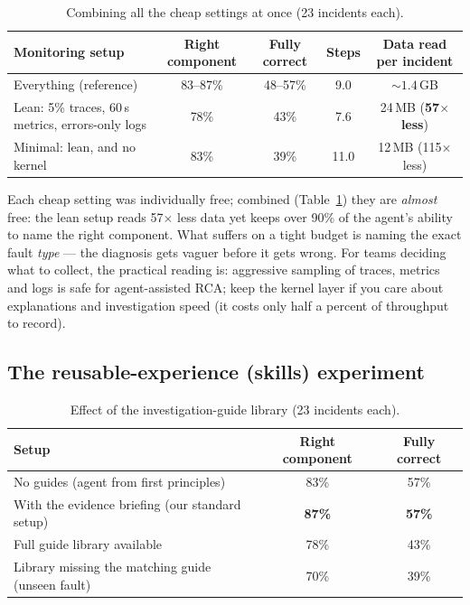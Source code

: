 \begin{table}[h]
\centering
\caption{Combining all the cheap settings at once (23 incidents each).}
\label{tab:budget}
\begin{tabular}{lcccc}
\toprule
Monitoring setup & Right component & Fully correct & Steps & Data read per incident \\
\midrule
Everything (reference) & 83--87\% & 48--57\% & 9.0 & ${\sim}1.4$\,GB \\
Lean: 5\% traces, 60\,s metrics, errors-only logs & 78\% & 43\% & 7.6 & 24\,MB (\textbf{57$\times$ less}) \\
Minimal: lean, and no kernel & 83\% & 39\% & 11.0 & 12\,MB (115$\times$ less) \\
\bottomrule
\end{tabular}
\end{table}

Each cheap setting was individually free; combined (Table~\ref{tab:budget}) they are
\emph{almost} free: the lean setup reads 57$\times$ less data yet keeps over 90\% of
the agent's ability to name the right component. What suffers on a tight budget is
naming the exact fault \emph{type} --- the diagnosis gets vaguer before it gets
wrong. For teams deciding what to collect, the practical reading is: aggressive
sampling of traces, metrics and logs is safe for agent-assisted RCA; keep the kernel
layer if you care about explanations and investigation speed (it costs only half a
percent of throughput to record).

\subsection{The reusable-experience (skills) experiment}

\begin{table}[h]
\centering
\caption{Effect of the investigation-guide library (23 incidents each).}
\label{tab:skills}
\begin{tabular}{lcc}
\toprule
Setup & Right component & Fully correct \\
\midrule
No guides (agent from first principles) & 83\% & 57\% \\
With the evidence briefing (our standard setup) & \textbf{87\%} & \textbf{57\%} \\
Full guide library available & 78\% & 43\% \\
Library missing the matching guide (unseen fault) & 70\% & 39\% \\
\bottomrule
\end{tabular}
\end{table}

